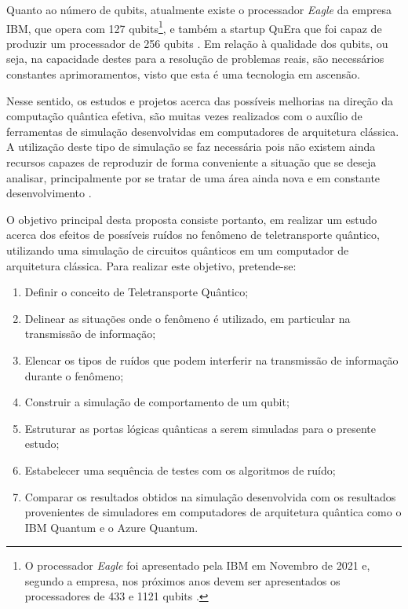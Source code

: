 \documentclass[12pt,oneside,brazil,hidelinks,article,sumario=tradicional,a4paper]{abntex2}
\begin{document}
Quanto ao número de qubits, atualmente existe o processador \textit{Eagle} da empresa IBM, que opera com 127 qubits\footnote{O processador \textit{Eagle} foi apresentado pela IBM em Novembro de 2021 e, segundo a empresa, nos próximos anos devem ser apresentados os processadores de 433 e 1121 qubits \cite{processadoribm}.}, e também a startup QuEra que foi capaz de produzir um processador de 256 qubits \cite{quera}. Em relação à qualidade dos qubits, ou seja, na capacidade destes para a resolução de problemas reais, são necessários constantes aprimoramentos, visto que esta é uma tecnologia em ascensão.

Nesse sentido, os estudos e projetos acerca das possíveis melhorias na direção da computação quântica efetiva, são muitas vezes realizados com o auxílio de ferramentas de simulação desenvolvidas em computadores de arquitetura clássica. A utilização deste tipo de simulação se faz necessária pois não existem ainda recursos capazes de reproduzir de forma conveniente a situação que se deseja analisar, principalmente por se tratar de uma área ainda nova e em constante desenvolvimento \cite{videoyoutube}.

O objetivo principal desta proposta consiste portanto, em realizar um estudo acerca dos efeitos de possíveis ruídos no fenômeno de teletransporte quântico, utilizando uma simulação de circuitos quânticos em um computador de arquitetura clássica. Para realizar este objetivo, pretende-se:
\begin{enumerate}
  \item Definir o conceito de Teletransporte Quântico;\label{obj1}
  \item Delinear as situações onde o fenômeno é utilizado, em particular na transmissão de informação;\label{obj2}
  \item Elencar os tipos de ruídos que podem interferir na transmissão de informação durante o fenômeno;\label{obj3}
  \item Construir a simulação de comportamento de um qubit;\label{obj4}
  \item Estruturar as portas lógicas quânticas a serem simuladas para o presente estudo;\label{obj5}
  \item Estabelecer uma sequência de testes com os algoritmos de ruído;\label{obj6}
  \item Comparar os resultados obtidos na simulação desenvolvida com os resultados provenientes de simuladores em computadores de arquitetura quântica como o IBM Quantum e o Azure Quantum.\label{obj7}
\end{enumerate}
\end{document}

